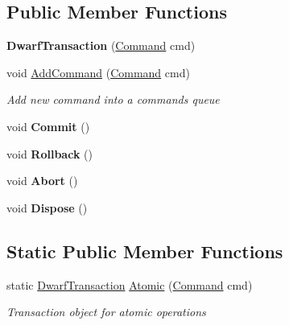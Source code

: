 \subsection*{Public Member Functions}
\begin{DoxyCompactItemize}
\item 
\hypertarget{class_dwarf_d_b_1_1_transactions_1_1_dwarf_transaction_a8032193531e6c8149e201dbbbf43e956}{{\bfseries Dwarf\+Transaction} (\hyperlink{class_dwarf_d_b_1_1_dwarf_command_1_1_command}{Command} cmd)}\label{class_dwarf_d_b_1_1_transactions_1_1_dwarf_transaction_a8032193531e6c8149e201dbbbf43e956}

\item 
void \hyperlink{class_dwarf_d_b_1_1_transactions_1_1_dwarf_transaction_aa367e43159fe986df49fa72bae4548d0}{Add\+Command} (\hyperlink{class_dwarf_d_b_1_1_dwarf_command_1_1_command}{Command} cmd)
\begin{DoxyCompactList}\small\item\em Add new command into a commands queue \end{DoxyCompactList}\item 
\hypertarget{class_dwarf_d_b_1_1_transactions_1_1_dwarf_transaction_aa6901ab0d5a7bb48ad194a786c76404d}{void {\bfseries Commit} ()}\label{class_dwarf_d_b_1_1_transactions_1_1_dwarf_transaction_aa6901ab0d5a7bb48ad194a786c76404d}

\item 
\hypertarget{class_dwarf_d_b_1_1_transactions_1_1_dwarf_transaction_ae3acb0398029e288a39acc7f13877fcf}{void {\bfseries Rollback} ()}\label{class_dwarf_d_b_1_1_transactions_1_1_dwarf_transaction_ae3acb0398029e288a39acc7f13877fcf}

\item 
\hypertarget{class_dwarf_d_b_1_1_transactions_1_1_dwarf_transaction_a8cbb54489cb4d76feffcf83c23427519}{void {\bfseries Abort} ()}\label{class_dwarf_d_b_1_1_transactions_1_1_dwarf_transaction_a8cbb54489cb4d76feffcf83c23427519}

\item 
\hypertarget{class_dwarf_d_b_1_1_transactions_1_1_dwarf_transaction_a2c36e0803f86461e1833187e4140a447}{void {\bfseries Dispose} ()}\label{class_dwarf_d_b_1_1_transactions_1_1_dwarf_transaction_a2c36e0803f86461e1833187e4140a447}

\end{DoxyCompactItemize}
\subsection*{Static Public Member Functions}
\begin{DoxyCompactItemize}
\item 
static \hyperlink{class_dwarf_d_b_1_1_transactions_1_1_dwarf_transaction}{Dwarf\+Transaction} \hyperlink{class_dwarf_d_b_1_1_transactions_1_1_dwarf_transaction_a660b18b542e2053f8d8b70555ee3d5d1}{Atomic} (\hyperlink{class_dwarf_d_b_1_1_dwarf_command_1_1_command}{Command} cmd)
\begin{DoxyCompactList}\small\item\em Transaction object for atomic operations \end{DoxyCompactList}\end{DoxyCompactItemize}
